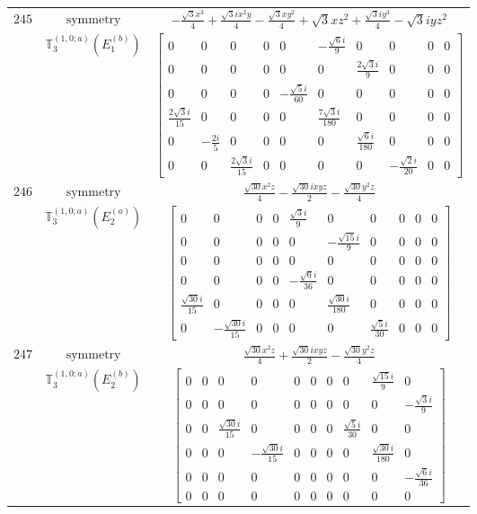 \documentclass[fleqn,8pt,landscape]{jsarticle}
\begin{document}
\begin{longtable}{ccc}
$ 245 $ & $ \text{symmetry} $ & $ - \frac{\sqrt{3} x^{3}}{4} + \frac{\sqrt{3} i x^{2} y}{4} - \frac{\sqrt{3} x y^{2}}{4} + \sqrt{3} x z^{2} + \frac{\sqrt{3} i y^{3}}{4} - \sqrt{3} i y z^{2} $ \\
$  $ & $ \mathbb{T}_{3}^{(1,0;a)}(E_{1}^{(b)}) $ & $ \begin{bmatrix} 0 & 0 & 0 & 0 & 0 & - \frac{\sqrt{6} i}{9} & 0 & 0 & 0 & 0 \\ 0 & 0 & 0 & 0 & 0 & 0 & \frac{2 \sqrt{3} i}{9} & 0 & 0 & 0 \\ 0 & 0 & 0 & 0 & - \frac{\sqrt{5} i}{60} & 0 & 0 & 0 & 0 & 0 \\ \frac{2 \sqrt{3} i}{15} & 0 & 0 & 0 & 0 & \frac{7 \sqrt{3} i}{180} & 0 & 0 & 0 & 0 \\ 0 & - \frac{2 i}{5} & 0 & 0 & 0 & 0 & \frac{\sqrt{6} i}{180} & 0 & 0 & 0 \\ 0 & 0 & \frac{2 \sqrt{3} i}{15} & 0 & 0 & 0 & 0 & - \frac{\sqrt{2} i}{20} & 0 & 0 \end{bmatrix} $ \\ \hline
$ 246 $ & $ \text{symmetry} $ & $ \frac{\sqrt{30} x^{2} z}{4} - \frac{\sqrt{30} i x y z}{2} - \frac{\sqrt{30} y^{2} z}{4} $ \\
$  $ & $ \mathbb{T}_{3}^{(1,0;a)}(E_{2}^{(a)}) $ & $ \begin{bmatrix} 0 & 0 & 0 & 0 & \frac{\sqrt{3} i}{9} & 0 & 0 & 0 & 0 & 0 \\ 0 & 0 & 0 & 0 & 0 & - \frac{\sqrt{15} i}{9} & 0 & 0 & 0 & 0 \\ 0 & 0 & 0 & 0 & 0 & 0 & 0 & 0 & 0 & 0 \\ 0 & 0 & 0 & 0 & - \frac{\sqrt{6} i}{36} & 0 & 0 & 0 & 0 & 0 \\ \frac{\sqrt{30} i}{15} & 0 & 0 & 0 & 0 & \frac{\sqrt{30} i}{180} & 0 & 0 & 0 & 0 \\ 0 & - \frac{\sqrt{30} i}{15} & 0 & 0 & 0 & 0 & \frac{\sqrt{5} i}{30} & 0 & 0 & 0 \end{bmatrix} $ \\ \hline
$ 247 $ & $ \text{symmetry} $ & $ \frac{\sqrt{30} x^{2} z}{4} + \frac{\sqrt{30} i x y z}{2} - \frac{\sqrt{30} y^{2} z}{4} $ \\
$  $ & $ \mathbb{T}_{3}^{(1,0;a)}(E_{2}^{(b)}) $ & $ \begin{bmatrix} 0 & 0 & 0 & 0 & 0 & 0 & 0 & 0 & \frac{\sqrt{15} i}{9} & 0 \\ 0 & 0 & 0 & 0 & 0 & 0 & 0 & 0 & 0 & - \frac{\sqrt{3} i}{9} \\ 0 & 0 & \frac{\sqrt{30} i}{15} & 0 & 0 & 0 & 0 & \frac{\sqrt{5} i}{30} & 0 & 0 \\ 0 & 0 & 0 & - \frac{\sqrt{30} i}{15} & 0 & 0 & 0 & 0 & \frac{\sqrt{30} i}{180} & 0 \\ 0 & 0 & 0 & 0 & 0 & 0 & 0 & 0 & 0 & - \frac{\sqrt{6} i}{36} \\ 0 & 0 & 0 & 0 & 0 & 0 & 0 & 0 & 0 & 0 \end{bmatrix} $ \\ \hline

\end{longtable}
\end{document}
